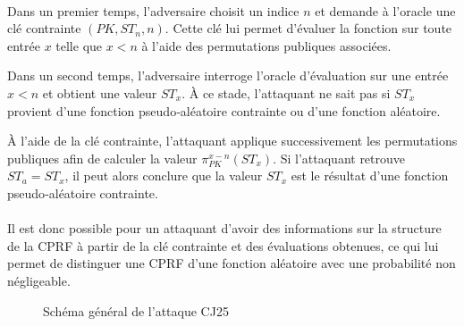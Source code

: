 \documentclass[9pt]{extarticle}
\begin{document}
\paragraph{}
Dans un premier temps, l’adversaire choisit un indice $n$ et demande à l’oracle une
clé contrainte $(PK, ST_n, n)$. Cette clé lui permet d’évaluer la fonction sur toute
entrée $x$ telle que $x < n$ à l’aide des permutations publiques associées.

Dans un second temps, l’adversaire interroge l’oracle d’évaluation sur une entrée
$x < n$ et obtient une valeur $ST_x$. À ce stade, l’attaquant ne sait pas si $ST_x$
provient d’une fonction pseudo‑aléatoire contrainte ou d’une fonction aléatoire.

À l’aide de la clé contrainte, l’attaquant applique successivement les permutations
publiques afin de calculer la valeur $\pi_{PK}^{x-n}(ST_x)$.
Si l'attaquant retrouve $ST_a = ST_x$, il peut alors conclure que la valeur $ST_x$ est le résultat d'une fonction pseudo‑aléatoire contrainte.

\paragraph{}Il est donc possible pour un attaquant d'avoir des informations sur la structure de la CPRF à partir de la clé contrainte et des évaluations obtenues, ce qui lui permet de distinguer une CPRF d'une fonction aléatoire avec une probabilité non négligeable.\\


\begin{figure}[H]
\centering
{}
\caption{Schéma général de l’attaque CJ25}
\end{figure}
\end{document}

